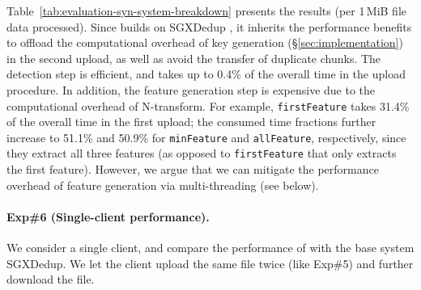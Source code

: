 Table~\ref{tab:evaluation-syn-system-breakdown} presents the results (per 1\,MiB file data processed). Since \prototype builds on SGXDedup \cite{ren21}, it inherits the performance benefits to offload the computational overhead of key generation (\S\ref{sec:implementation}) in the second upload, as well as avoid the transfer of duplicate chunks. The detection step is efficient, and takes up to 0.4\% of the overall time in the upload procedure. In addition, the feature generation step is expensive due to the computational overhead of N-transform. For example, {\tt firstFeature} takes 31.4\% of the overall time in the first upload; the consumed time fractions further increase to  51.1\% and 50.9\% for
{\tt minFeature} and {\tt allFeature}, respectively, since they extract all three features (as opposed to {\tt firstFeature} that only extracts the first feature). However, we argue that we can mitigate the performance overhead of feature generation via multi-threading (see below).






\paragraph{Exp\#6 (Single-client performance).}
We consider a single client, and compare the performance of \prototype with the base system SGXDedup. We let the client upload the same file twice (like Exp\#5) and further download the file.


